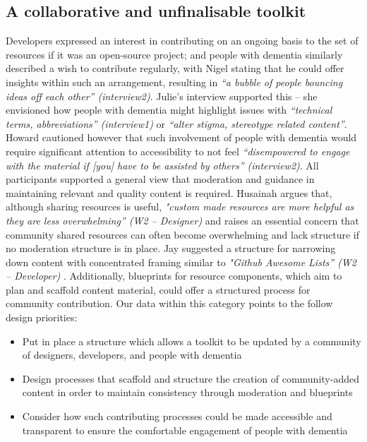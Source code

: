 \subsection{A collaborative and unfinalisable toolkit}
Developers expressed an interest in contributing on an ongoing basis to the set of resources if it was an open-source project; and people with dementia similarly described a wish to contribute regularly, with Nigel stating that he could offer insights within such an arrangement, resulting in \textit{“a bubble of people bouncing ideas off each other” (interview2)}. Julie’s interview supported this – she envisioned how people with dementia might highlight issues with \textit{“technical terms, abbreviations” (interview1)} or \textit{“alter stigma, stereotype related content”}. Howard cautioned however that such involvement of people with dementia would require significant attention to accessibility to not feel \textit{“disempowered to engage with the material if [you] have to be assisted by others” (interview2)}. 
All participants supported a general view that moderation and guidance in maintaining relevant and quality content is required. Husainah argues that, although sharing resources is useful, \textit{"custom made resources are more helpful as they are less overwhelming” (W2 – Designer)} and raises an essential concern that community shared resources can often become overwhelming and lack structure if no moderation structure is in place. Jay suggested a structure for narrowing down content with concentrated framing similar to \textit{"Github Awesome Lists” (W2 – Developer) }\citep{sorhus_sindresorhusawesome_2021}. Additionally, blueprints for resource components, which aim to plan and scaffold content material, could offer a structured process for community contribution.
Our data within this category points to the follow design priorities:

\begin{itemize}
\item Put in place a structure which allows a toolkit to be updated by a community of designers, developers, and people with dementia
\item Design processes that scaffold and structure the creation of community-added content in order to maintain consistency through moderation and blueprints
\item Consider how such contributing processes could be made accessible and transparent to ensure the comfortable engagement of people with dementia
\end{itemize}

